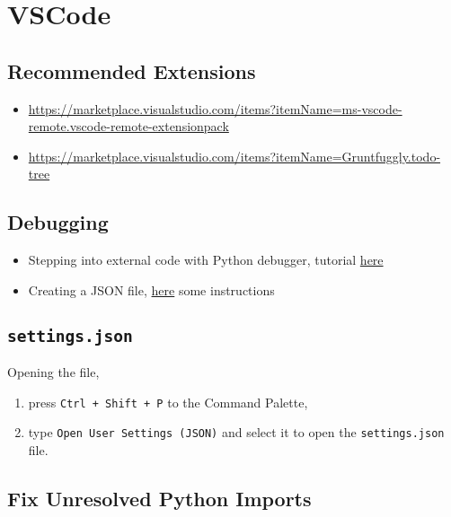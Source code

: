 \documentclass[12pt, a4paper]{scrbook}
\numberwithin{equation}{section}
\theoremstyle{definition}
\theoremstyle{definition}
\begin{document}
\chapter{VSCode}

	\section{Recommended Extensions}
	
		\begin{itemize}
					
			\item  \url{https://marketplace.visualstudio.com/items?itemName=ms-vscode-remote.vscode-remote-extensionpack}
		
			\item \url{https://marketplace.visualstudio.com/items?itemName=Gruntfuggly.todo-tree}
		
		\end{itemize}	

	\section{Debugging}
	
	\begin{itemize}
		\item Stepping into external code with Python debugger, tutorial \href{https://stackoverflow.com/questions/53594900/visual-studio-code-python-debugging-step-into-the-code-of-external-functions}{here}
		
		\item Creating a JSON file, \href{https://code.visualstudio.com/docs/python/debugging}{here} some instructions
	\end{itemize}

	\section{\texttt{settings.json}}\label{app:open_settings_file_vs}
		Opening the file,
		
		\begin{enumerate}
			\item press \texttt{Ctrl + Shift + P} to the Command Palette, 
			\item type \texttt{Open User Settings (JSON)} and select it to open the \texttt{settings.json} file.
		\end{enumerate}


	\section{Fix Unresolved Python Imports}
	
\end{document}
